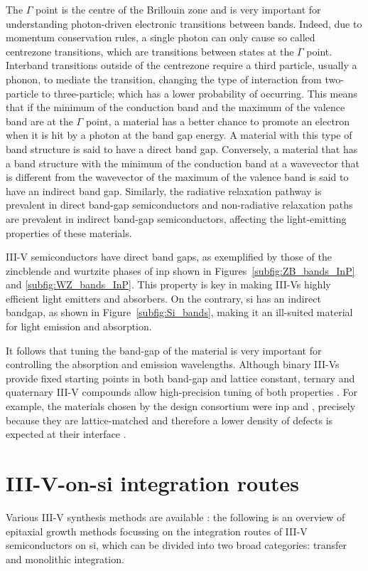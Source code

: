 The $\Gamma$ point is the centre of the Brillouin zone and is very important for understanding photon-driven electronic transitions between bands. Indeed, due to momentum conservation rules, a single photon can only cause so called centrezone transitions, which are transitions between states at the $\Gamma$ point. Interband transitions outside of the centrezone require a third particle, usually a phonon, to mediate the transition, changing the type of interaction from two-particle to three-particle; which has a lower probability of occurring. This means that if the minimum of the conduction band and the maximum of the valence band are at the $\Gamma$ point, a material has a better chance to promote an electron when it is hit by a photon at the band gap energy. A material with this type of band structure is said to have a direct band gap. Conversely, a material that has a band structure with the minimum of the conduction band at a wavevector that is different from the wavevector of the maximum of the valence band is said to have an indirect band gap. Similarly, the radiative relaxation pathway is prevalent in direct band-gap semiconductors and non-radiative relaxation paths are prevalent in indirect band-gap semiconductors, affecting the light-emitting properties of these materials.

III-V semiconductors have direct band gaps, as exemplified by those of the zincblende and wurtzite phases of  \acl{inp} shown in Figures~\ref{subfig:ZB_bands_InP} and \ref{subfig:WZ_bands_InP}. This property is key in making III-Vs highly efficient light emitters and absorbers. On the contrary, \acl{si} has an indirect bandgap, as shown in Figure~\ref{subfig:Si_bands}, making it an ill-suited material for light emission and absorption.

It follows that tuning the band-gap of the material is very important for controlling the absorption and emission wavelengths. Although binary III-Vs provide fixed starting points in both band-gap and lattice constant, ternary and quaternary III-V compounds allow high-precision tuning of both properties \cite{Ning2017}. For example, the materials chosen by the \acs{design} consortium were \acs{inp} and , precisely because they are lattice-matched and therefore a lower density of defects is expected at their interface \cite{Pearsall1980, Sugii1983, Wagner1970}.

\section{\texorpdfstring{III-V-on-\acs{si} integration routes}{III-V-on-Si integration routes}}
Various III-V synthesis methods are available \cite{Kuech2016}: the following is an overview of epitaxial growth methods focussing on the integration routes of III-V semiconductors on \acl{si}, which can be divided into two broad categories: transfer and monolithic integration.

